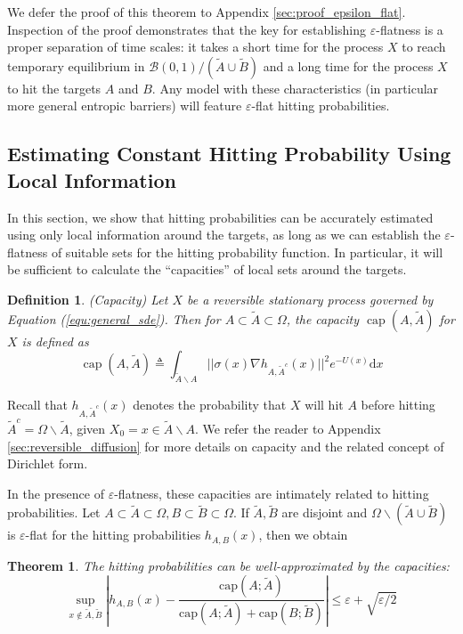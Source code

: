 \documentclass[english, aip, jcp, priprint, graphicx,floatfix]{revtex4-1}
\newtheorem{definition}{Definition}
\newtheorem{theorem}{Theorem}
\theoremstyle{plain}
\theoremstyle{definition}
\theoremstyle{plain}
\newcommand{\capac}[2]{\mathrm{cap}\left(#1;#2\right)}
\newcommand{\bb}[1]{\mathcal{B}\left(#1\right)}
\begin{document}
We defer the proof of this theorem to Appendix \ref{sec:proof_epsilon_flat}. Inspection of the proof demonstrates that the key for establishing $\varepsilon$-flatness is a proper separation of time scales: it takes a short time for the process $X$ to reach temporary equilibrium in $\bb {0, 1} / (\tilde{A} \cup \tilde{B})$ and a long time for the process $X$ to hit the targets $A$ and $B$.  Any model with these characteristics (in particular more general entropic barriers) will feature $\varepsilon$-flat hitting probabilities.

\subsection{Estimating Constant Hitting Probability Using Local Information}

In this section, we show that hitting probabilities can be accurately estimated using only local information around the targets, as long as we can establish the $\varepsilon$-flatness of suitable sets for the hitting probability function. In particular, it will be sufficient to calculate the ``capacities'' of local sets around the targets.

\begin{definition}(Capacity)
Let $X$ be a reversible stationary process governed by Equation (\ref{equ:general_sde}).  Then for $A \subset \tilde{A} \subset \Omega$, the capacity $\ensuremath{\operatorname{cap}} (A, \tilde{A})$ for $X$ is defined as
%
\[ \ensuremath{\operatorname{cap}} (A, \tilde{A}) \triangleq \int_{\tilde A \backslash A}
||\sigma(x) \nabla h_{A, \tilde{A}^c}(x)||^2 e^{- U(x)} \mathrm{d} x \]
%
\end{definition}

Recall that $h_{A, \tilde{A}^c}(x)$ denotes the probability that $X$ will hit $A$ before hitting $\tilde{A}^c=\Omega \backslash \tilde A$, given $X_0=x \in \tilde A\backslash A$.  We refer the reader to Appendix \ref{sec:reversible_diffusion} for more details on capacity and the related concept of Dirichlet form.

In the presence of $\varepsilon$-flatness, these capacities are intimately related to hitting probabilities.  Let $A\subset\tilde A\subset\Omega,B\subset\tilde B\subset\Omega$.  If $\tilde A,\tilde B$ are disjoint and $\Omega \backslash (\tilde A \cup \tilde B)$ is $\varepsilon$-flat for the hitting probabilities $h_{A,B}(x)$, then we obtain

\begin{theorem}\label{thm:main_thm}  The hitting probabilities can be well-approximated by the capacities:
\[ \sup_{x \notin \tilde A,\tilde B} \left| h_{A,B} (x) - \frac{\capac{A}{\tilde A}}{\capac{A}{\tilde A}+\capac{B}{\tilde B}} \right| \leqslant \varepsilon + \sqrt{\varepsilon/2} \]
\end{theorem}
\end{document}

